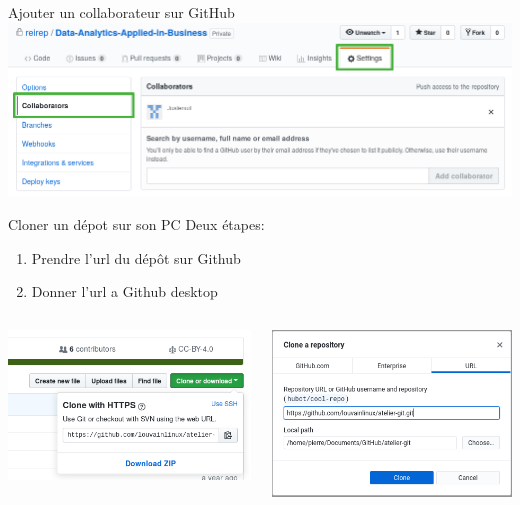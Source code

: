\documentclass{beamer}
\begin{document}
\begin{frame}{Ajouter un collaborateur sur GitHub}
    \includegraphics[width=\textwidth]{img/github_desktop/colaborator.png}
\end{frame}

\begin{frame}{Cloner un dépot sur son PC}
    Deux étapes:
    \begin{enumerate}
        \item Prendre l'url du dépôt sur Github
        \item Donner l'url a Github desktop
    \end{enumerate}
    \begin{columns}    
        \begin{column}{0.5\textwidth}
            \includegraphics[width=.9\textwidth]{img/github_desktop/clone_repo.png}\\ $ $\\
        \end{column}
        \begin{column}{0.5\textwidth}
            \includegraphics[width=.9\textwidth]{img/github_desktop/clone_repo_desktop_2.png}\\

\end{column}
\end{columns}
\end{frame}
\end{document}

